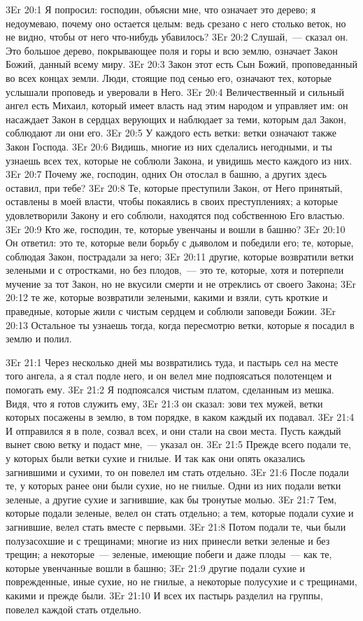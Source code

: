 \vs 3Er 20:1
Я попросил: господин,
объясни мне, что означает это дерево; я недоумеваю, почему оно остается целым:
ведь срезано с него столько веток, но не видно, чтобы от него что-нибудь
убавилось?
\vs 3Er 20:2
Слушай,~--- сказал он. Это
большое дерево, покрывающее поля и горы и всю землю, означает Закон Божий,
данный всему миру.
\vs 3Er 20:3
Закон этот есть Сын Божий,
проповеданный во всех концах земли. Люди, стоящие под сенью его, означают тех,
которые услышали проповедь и уверовали в Него.
\vs 3Er 20:4
Величественный и сильный
ангел есть Михаил, который имеет власть над этим народом и управляет им: он
насаждает Закон в сердцах верующих и наблюдает за теми, которым дал Закон,
соблюдают ли они его.
\vs 3Er 20:5
У каждого есть ветки:
ветки означают также Закон Господа.
\vs 3Er 20:6
Видишь, многие из них
сделались негодными, и ты узнаешь всех тех, которые не соблюли Закона, и
увидишь место каждого из них.
\vs 3Er 20:7
Почему же, господин, одних
Он отослал в башню, а других здесь оставил, при тебе?
\vs 3Er 20:8
Те, которые преступили
Закон, от Него принятый, оставлены в моей власти, чтобы покаялись в своих
преступлениях; а которые удовлетворили Закону и его соблюли, находятся под
собственною Его властью.
\vs 3Er 20:9
Кто же, господин, те,
которые увенчаны и вошли в башню?
\vs 3Er 20:10
Он ответил: это те,
которые вели борьбу с дьяволом и победили его; те, которые, соблюдая Закон,
пострадали за него;
\vs 3Er 20:11
другие, которые
возвратили ветки зелеными и с отростками, но без плодов,~--- это те, которые,
хотя и потерпели мучение за тот Закон, но не вкусили смерти и не отреклись от
своего Закона;
\vs 3Er 20:12
те же, которые возвратили
зелеными, какими и взяли, суть кроткие и праведные, которые жили с чистым
сердцем и соблюли заповеди Божии.
\vs 3Er 20:13
Остальное ты узнаешь
тогда, когда пересмотрю ветки, которые я посадил в землю и полил.

\vs 3Er 21:1
Через несколько дней мы
возвратились туда, и пастырь сел на месте того ангела, а я стал подле него, и
он велел мне подпоясаться полотенцем и помогать ему.
\vs 3Er 21:2
Я подпоясался чистым
платом, сделанным из мешка. Видя, что я готов служить ему,
\vs 3Er 21:3
он сказал: зови тех мужей,
ветки которых посажены в землю, в том порядке, в каком каждый их подавал.
\vs 3Er 21:4
И отправился я в поле,
созвал всех, и они стали на свои места. Пусть каждый вынет свою ветку и подаст
мне,~--- указал он.
\vs 3Er 21:5
Прежде всего подали те, у
которых были ветки сухие и гнилые. И так как они опять оказались загнившими и
сухими, то он повелел им стать отдельно.
\vs 3Er 21:6
После подали те, у которых
ранее они были сухие, но не гнилые. Одни из них подали ветки зеленые, а другие
сухие и загнившие, как бы тронутые молью.
\vs 3Er 21:7
Тем, которые подали
зеленые, велел он стать отдельно; а тем, которые подали сухие и загнившие,
велел стать вместе с первыми.
\vs 3Er 21:8
Потом подали те, чьи были
полузасохшие и с трещинами; многие из них принесли ветки зеленые и без трещин;
а некоторые~--- зеленые, имеющие побеги и даже плоды~--- как те, которые
увенчанные вошли в башню;
\vs 3Er 21:9
другие подали сухие и
поврежденные, иные сухие, но не гнилые, а некоторые полусухие и с трещинами,
какими и прежде были.
\vs 3Er 21:10
И всех их пастырь
разделил на группы, повелел каждой стать отдельно.

